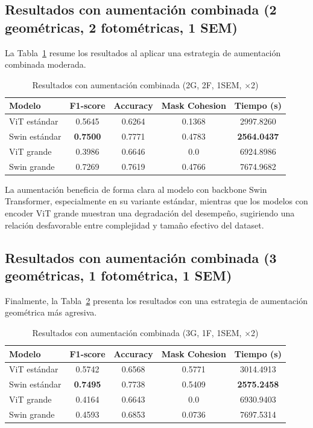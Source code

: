 \documentclass[onecolumn, 12pt , journal]{IEEEtran}
\begin{document}
\subsection{Resultados con aumentación combinada (2 geométricas, 2 fotométricas, 1 SEM)}

La Tabla~\ref{tab:results_combined_2geo} resume los resultados al aplicar una estrategia de aumentación combinada moderada.

\begin{table}[ht]
\centering
\caption{Resultados con aumentación combinada (2G, 2F, 1SEM, $\times$2)}
\label{tab:results_combined_2geo}
\begin{tabular}{lcccc}
\hline
\textbf{Modelo} & \textbf{F1-score} & \textbf{Accuracy} & \textbf{Mask Cohesion} & \textbf{Tiempo (s)} \\
\hline
ViT estándar & 0.5645 & 0.6264 & 0.1368 & 2997.8260 \\
Swin estándar & \textbf{0.7500} & 0.7771 & 0.4783 & \textbf{2564.0437} \\
ViT grande & 0.3986 & 0.6646 & 0.0 & 6924.8986 \\
Swin grande & 0.7269 & 0.7619 & 0.4766 & 7674.9682 \\
\hline
\end{tabular}
\end{table}

La aumentación beneficia de forma clara al modelo con backbone Swin Transformer, especialmente en su variante estándar, mientras que los modelos con encoder ViT grande muestran una degradación del desempeño, sugiriendo una relación desfavorable entre complejidad y tamaño efectivo del dataset.

\subsection{Resultados con aumentación combinada (3 geométricas, 1 fotométrica, 1 SEM)}

Finalmente, la Tabla~\ref{tab:results_combined_3geo} presenta los resultados con una estrategia de aumentación geométrica más agresiva.

\begin{table}[ht]
\centering
\caption{Resultados con aumentación combinada (3G, 1F, 1SEM, $\times$2)}
\label{tab:results_combined_3geo}
\begin{tabular}{lcccc}
\hline
\textbf{Modelo} & \textbf{F1-score} & \textbf{Accuracy} & \textbf{Mask Cohesion} & \textbf{Tiempo (s)} \\
\hline
ViT estándar & 0.5742 & 0.6568 & 0.5771 & 3014.4913 \\
Swin estándar & \textbf{0.7495} & 0.7738 & 0.5409 & \textbf{2575.2458} \\
ViT grande & 0.4164 & 0.6643 & 0.0 & 6930.9403 \\
Swin grande & 0.4593 & 0.6853 & 0.0736 & 7697.5314 \\
\hline
\end{tabular}
\end{table}
\end{document}
